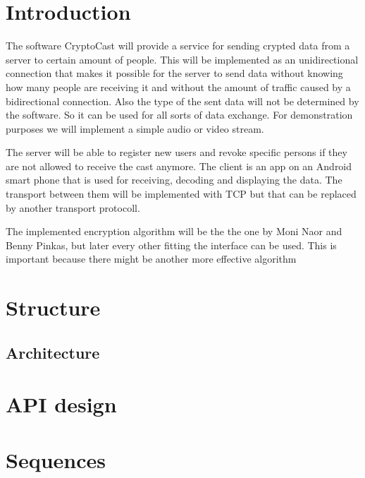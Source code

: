\documentclass[a4paper,10pt]{scrartcl}
\title{\doctitle}
\author{\authorName}
\date{\today}
\begin{document}

\tableofcontents
\clearpage

\section{Introduction}
The software CryptoCast will provide a service for sending crypted data from a server to certain
amount of people.  This will be implemented as an unidirectional connection that makes it possible for the server
to send data without knowing how many people are receiving it and without the amount of traffic caused
by a bidirectional connection.  Also the type of the sent data will not be determined by the software. So it can be
used for all sorts of data exchange. For demonstration purposes we will implement a simple audio or video stream.

The server will be able to register new users and revoke specific persons if they are not allowed to receive the cast anymore. 
The client is an app on an Android smart phone that is used for receiving, decoding and displaying the data. 
The transport between them will be implemented with TCP but that can be replaced by another transport protocoll.

The implemented encryption algorithm will be the the one by Moni Naor and Benny Pinkas, but later every other fitting the
interface can be used. This is important because there might be another more effective algorithm 


\section{Structure}
\subsection{Architecture}

\section{API design}


\section{Sequences}

%
\end{document}
